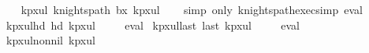 \begin{isabellebody}
\ \ {\isacharbrackleft}{\kern0pt}{}{\isacharcomma}{\kern0pt}{}{}{\isacharcomma}{\kern0pt}{}{}{\isacharcomma}{\kern0pt}{}{}{\isacharcomma}{\kern0pt}{}{}{\isacharcomma}{\kern0pt}{}{}{\isacharbrackright}{\kern0pt}{\isacharbrackright}{\kern0pt}{\isacharparenright}{\kern0pt}{\isachardoublequoteclose}\isanewline
{}\isamarkupfalse%
\ kp{\isacharunderscore}{\kern0pt}{}x{}{\isacharunderscore}{\kern0pt}ul{\isacharcolon}{\kern0pt}\ {\isachardoublequoteopen}knights{\isacharunderscore}{\kern0pt}path\ b{}x{}\ kp{}x{}ul{\isachardoublequoteclose}\isanewline
%
\isadelimproof
\ \ %
\endisadelimproof
%
\isatagproof
{}\isamarkupfalse%
\ {\isacharparenleft}{\kern0pt}simp\ only{\isacharcolon}{\kern0pt}\ knights{\isacharunderscore}{\kern0pt}path{\isacharunderscore}{\kern0pt}exec{\isacharunderscore}{\kern0pt}simp{\isacharparenright}{\kern0pt}\ eval%
\endisatagproof
{\isafoldproof}%
%
\isadelimproof
\isanewline
%
\endisadelimproof
\isanewline
{}\isamarkupfalse%
\ kp{\isacharunderscore}{\kern0pt}{}x{}{\isacharunderscore}{\kern0pt}ul{\isacharunderscore}{\kern0pt}hd{\isacharcolon}{\kern0pt}\ {\isachardoublequoteopen}hd\ kp{}x{}ul\ {\isacharequal}{\kern0pt}\ {\isacharparenleft}{\kern0pt}{}{\isacharcomma}{\kern0pt}{}{\isacharparenright}{\kern0pt}{\isachardoublequoteclose}%
\isadelimproof
\ %
\endisadelimproof
%
\isatagproof
{}\isamarkupfalse%
\ eval%
\endisatagproof
{\isafoldproof}%
%
\isadelimproof
%
\endisadelimproof
\isanewline
\isanewline
{}\isamarkupfalse%
\ kp{\isacharunderscore}{\kern0pt}{}x{}{\isacharunderscore}{\kern0pt}ul{\isacharunderscore}{\kern0pt}last{\isacharcolon}{\kern0pt}\ {\isachardoublequoteopen}last\ kp{}x{}ul\ {\isacharequal}{\kern0pt}\ {\isacharparenleft}{\kern0pt}{}{\isacharcomma}{\kern0pt}{}{\isacharparenright}{\kern0pt}{\isachardoublequoteclose}%
\isadelimproof
\ %
\endisadelimproof
%
\isatagproof
{}\isamarkupfalse%
\ eval%
\endisatagproof
{\isafoldproof}%
%
\isadelimproof
%
\endisadelimproof
\isanewline
\isanewline
{}\isamarkupfalse%
\ kp{\isacharunderscore}{\kern0pt}{}x{}{\isacharunderscore}{\kern0pt}ul{\isacharunderscore}{\kern0pt}non{\isacharunderscore}{\kern0pt}nil{\isacharcolon}{\kern0pt}\ {\isachardoublequoteopen}kp{}x{}ul\ {\isasymnoteq}\ {\isacharbrackleft}{\kern0pt}{\isacharbrackright}{\kern0pt}{\isachardoublequoteclose}%

\end{isabellebody}

